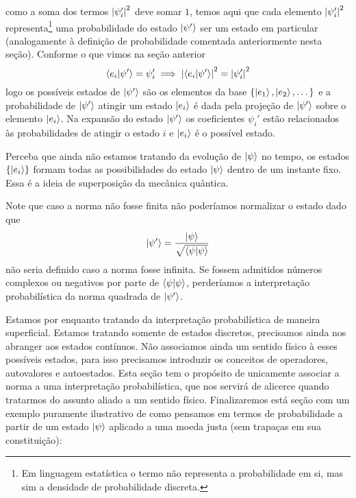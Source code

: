 como a soma dos termos $\abs{\psi_i'}^2$ deve somar $1$, temos aqui que cada elemento $\abs{\psi_i'}^2$ representa\footnote{Em linguagem estatística o termo não representa a probabilidade em si, mas sim a densidade de probabilidade discreta.} uma probabilidade do estado $\ket{\psi'}$ ser um estado em particular (analogamente à definição de probabilidade comentada anteriormente nesta seção). Conforme o que vimos na seção anterior
\begin{equation*}
    \braket{e_i}{\psi'} = \psi_i' \implies \abs{\braket{e_i}{\psi'}}^2 = \abs{\psi_i'}^2
\end{equation*}
logo os possíveis estados de $\ket{\psi'}$ são os elementos da base $\{\ket{e_1}, \ket{e_2}, \dots\}$ e a probabilidade de $\ket{\psi'}$ atingir um estado $\ket{e_i}$ é dada pela projeção de $\ket{\psi'}$ sobre o elemento $\ket{e_i}$. Na expansão do estado $\ket{\psi'}$ os coeficientes $\psi_i'$ estão relacionados às probabilidades de atingir o estado $i$ e $\ket{e_i}$ é o possível estado.

Perceba que ainda não estamos tratando da evolução de $\ket{\psi}$ no tempo, os estados $\{\ket{e_i}\}$ formam todas as possibilidades do estado $\ket{\psi}$ dentro de um instante fixo. Essa é a ideia de superposição da mecânica quântica.

\begin{note}{}
        Note que caso a norma não fosse finita não poderíamos normalizar o estado dado que 
        \begin{equation*}
            \ket{\psi^\prime} = \frac{\ket{\psi}}{\sqrt{\braket{\psi}{\psi}}}
        \end{equation*}
        não seria definido caso a norma fosse infinita. Se fossem admitidos números complexos ou negativos por parte de $\braket{\psi}{\psi}$, perderíamos a interpretação probabilística da norma quadrada de $\ket{\psi'}$. 
\end{note}

Estamos por enquanto tratando da interpretação probabilística de maneira superficial. Estamos tratando somente de estados discretos, precisamos ainda nos abranger aos estados contínuos. Não associamos ainda um sentido físico à esses possíveis estados, para isso precisamos introduzir os conceitos de operadores, autovalores e autoestados. Esta seção tem o propósito de unicamente associar a norma a uma interpretação probabilística, que nos servirá de alicerce quando tratarmos do assunto aliado a um sentido físico. Finalizaremos está seção com um exemplo puramente ilustrativo de como pensamos em termos de probabilidade a partir de um estado $\ket{\psi}$ aplicado a uma moeda justa (sem trapaças em sua constituição):

